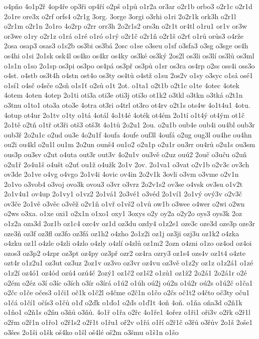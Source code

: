o4pňo
4o1p2ř
4op4ře
op3ři
op4ří
o2pš
o1pů
o1r2a
or3ar
o2r1b
orbo3
o2r1c
o2r1d
2o1re
ore3x
o2rf
orfs4
o2r1g
3org.
3orge
3orgi
o3rhi
o1ri
2o2r1k
ork3h
o2r1l
o2r1m
o2r1n
2o1ro
4o2rp
o2rr
orr3h
2o2r1s2
ors3n
o2r1t
or4tl
o1ru1
or1v
or3w
or3we
o1ry
o2r1z
o1rá
o1ré
o1ró
o1rý
o2r1č
o2r1ň
o2r1š
o2rť
o1rů
orůs3
o4rže
2osa
osap3
osas3
o1s2b
os3bi
os3bá
2osc
o1se
o3seu
o1sf
o3sfa3
o3sg
o3sge
os4h
os4hi
o1si
2o1sk
osk4l
os4ko
os4kr
os4ky
os3ké
os3ký
2os2l
os3li
os3lí
os3lů
os3ml
o1s1n
o1so
2o1sp
os3pi
os3po
os4pá
os3př
os3pů
o1sr
os3ra
os4rp
o2ss
oss4i
oss3o
o4st.
o4stb
os3t4h
o4stn
ost4o
os3ty
os4tů
o4stž
o1su
2os2v
o1sy
o3syc
o1sá
osé1
o1sí1
o4sč
o4sče
o2sň
o1s1ť
o2sů
o1t
2ot.
o1ta1
o2t1b
o2t1c
o1te
4otec
4otek
4otem
4oten
4otep
2o1ti
oti3a
oti3e
oti3j
oti3o
ot1k2
o3tkl
o3tkn
o3tká
o2t1n
o3tnu
o1to1
oto3a
oto3e
4otra
ot3ri
o4trl
ot3ro
ot4rv
o2t1s
ots4w
4o1t4u1
4otu.
4otup
ot4ur
2o1tv
o1ty
o1tá
4otál
4o1t4é
4oték
ot4ém
2o1tí
o1t4ý
ot4ým
ot1č
2o1tě
o2tň
o1tř
ot3ři
otš3
otš3t
4o1tů
2o2u1
2ou.
o2u1b
oub4e
oub4i
ou4bl
oub3r
oub3ř
2o2u1c
o2ud
ou3e
4o2u1f
4oufa
4oufe
ouf3l
4oufá
o2ug
oug3l
ou4he
ou4hn
ou2i
ou4kl
o2u1l
ou1m
2o2un
ounš4
ou1o2
o2u1p
o2u1r
ou3rr
ou4rů
o2u1s
ou3sm
ous3p
ou3sv
o2ut
o4uta
out3r
out3v
4o2u1v
ou3vě
o2uz
ouú2
2ouč
o3uču
o2uň
o2u1ř
2o4u1š
o4ušt
o2uť
ou1ž
o4užk
2o1v
2ov.
2o1va1
o3vat
o2v1b
o2v3c
ov3ch
ov3de
2o1ve
o4vg
o4vgo
2o1v4i
4ovic
ov4in
2o2v1k
3ovli
o3vm
o3vme
o2v1n
2o1vo
o3vob4
o3voj
ovo3k
ovou3
o3vr
o3vrz
2o2v1s2
ov3se
o4vsk
ov3su
o1v2t
2o1v4u1
ov4up
2o1vy1
o1vz2
2o1vá1
2o3vé1
o3véd
2o1ví1
2o1vý
ový3v
o2v3č
ov3če
2o1vě
o3věc
o3věž
o2v1ň
o1vř
o1vš2
o1vů
ow1b
o3wee
o4wer
o2wi
o2wn
o2ws
o3xa.
o1xe
oxi1
o2x1n
o1xo1
oxy1
3oxys
o2y
oy2a
o2y2o
oys3
oys3k
2oz
o1z2a
oza3d
2oz1b
oz1c4
ozc4v
oz1d
oz3du
ozdy4
o1z2e1
oze3c
oze3d
oze3p
oze3r
oze3ň
oz3f
oz3fl
oz3fo
oz3fá
oz1h2
o4zho
2o1z2i
oz1j
oz3ji
ozj3u
oz1k2
o4zka
o4zku
oz1l
o4zle
o4zli
o4zlo
o4zly
o4zlí
o4zlů
oz1m2
2ozn
o4zni
o1zo
oz4od
oz4oi
ozos3
oz3p2
o4zpr
oz3pt
oz4py
oz3př
ozr2
oz4ra
ozry3
oz1s4
ozs4v
oz1t4
o4zte
ozt4r
o1z2u1
oz3ut
oz3uz
2oz1v
oz3vo
oz3vr
oz4vu
oz3vě
o1z2y
oz1z
o1z2á1
o1zé
o1z2í
oz4ó1
oz4ód
ozú4
ozú4č
2ozý1
oz1č2
oz1š2
o1zů1
oz1ž2
2o2á1
2o2á1r
o2é
o2ém
o2éz
o3í
o3íc
o3ích
o3ír
o3írá
o1ú2
o1úh
oú2j
oú2n
o1ú2r
oú2s
o1ú2č
o1ča1
o2čc
o1če
očes3
o1či1
oč1k
o1č2l
o4čme
o2č1n
o1čo
o2čs
oč1t2
o4čto
oč3ty
oču1
o1čá
o1čí1
očís3
o1čů
o1ď
o2ďk
o1ďo1
o2ďs
o1ď1t
4oň
4oň.
o1ňa
oňa3d
o2ň1k
o1ňo1
o2ň1s
o2ňu
o3ňů
o3ňů.
4o1ř
o1řa
o2řc
4o1ře1
4ořez
o1ři1
oři3v
o2řk
o2ř1l
o2řm
o2ř1n
o1řo1
o2ř1s2
o2ř1t
o1řu1
oř2v
o1řá
o1ří
o2ř1č
o3řů
o3řův
2o1š
2oše1
o3šes
2o1ši
o1šk
oš4ko
o1šl
oš4lé
oš2m
o3šmu
o1š1n
o1šo
